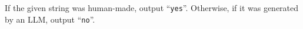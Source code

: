 
    If the given string was human-made, output ``\texttt{yes}''.
    Otherwise, if it was generated by an LLM, output ``\texttt{no}''.

